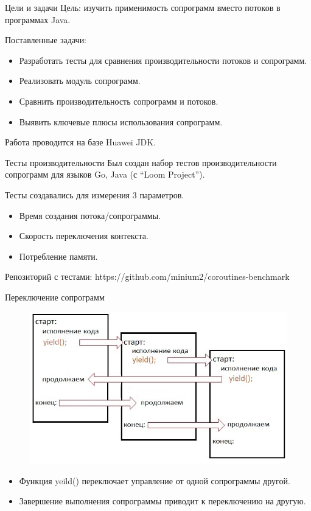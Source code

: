\begin{frame}{Цели и задачи}
	Цель: изучить применимость сопрограмм вместо потоков в программах Java.
	\par
	Поставленные задачи:
	\begin{itemize}
		\item Разработать тесты для сравнения производительности потоков и сопрограмм.
		\item Реализовать модуль сопрограмм.
		\item Сравнить производительность сопрограмм и потоков.
		\item Выявить ключевые плюсы использования сопрограмм.
	\end{itemize}
	Работа проводится на базе Huawei JDK.
\end{frame} 

\begin{frame}{Тесты производительности}
	Был создан набор тестов производительности сопрограмм для языков Go, Java (с “Loom Project”).
	
	Тесты создавались для измерения 3 параметров.
	\begin{itemize}
		\item Время создания потока/сопрограммы. 
		\item Скорость переключения контекста.
		\item Потребление памяти.
	\end{itemize}
	Репозиторий с тестами: https://github.com/minium2/coroutines-benchmark
\end{frame}

\begin{frame}{Переключение сопрограмм}
	\begin{figure}
		\includegraphics[scale=0.5]{images/scheme.jpg}
	\end{figure}
	\par
	\begin{itemize}
		\item Функция yeild() переключает управление от одной сопрограммы другой.
		\item Завершение выполнения сопрограммы приводит к переключению на другую.
	\end{itemize}
\end{frame}

